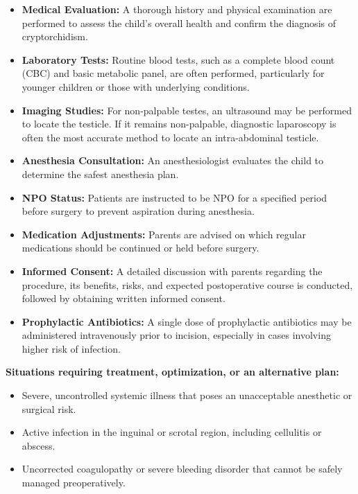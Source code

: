 \begin{itemize}
  \item \textbf{Medical Evaluation:} A thorough history and physical examination are performed to assess the child's overall health and confirm the diagnosis of cryptorchidism.
  
  \item \textbf{Laboratory Tests:} Routine blood tests, such as a complete blood count (CBC) and basic metabolic panel, are often performed, particularly for younger children or those with underlying conditions.
  
  \item \textbf{Imaging Studies:} For non-palpable testes, an ultrasound may be performed to locate the testicle. If it remains non-palpable, diagnostic laparoscopy is often the most accurate method to locate an intra-abdominal testicle.
  
  \item \textbf{Anesthesia Consultation:} An anesthesiologist evaluates the child to determine the safest anesthesia plan.
  
  \item \textbf{NPO Status:} Patients are instructed to be NPO for a specified period before surgery to prevent aspiration during anesthesia.
  
  \item \textbf{Medication Adjustments:} Parents are advised on which regular medications should be continued or held before surgery.
  
  \item \textbf{Informed Consent:} A detailed discussion with parents regarding the procedure, its benefits, risks, and expected postoperative course is conducted, followed by obtaining written informed consent.
  
  \item \textbf{Prophylactic Antibiotics:} A single dose of prophylactic antibiotics may be administered intravenously prior to incision, especially in cases involving higher risk of infection.
\end{itemize}

\textbf{Situations requiring treatment, optimization, or an alternative plan:}

\begin{itemize}
  \item Severe, uncontrolled systemic illness that poses an unacceptable anesthetic or surgical risk.
  \item Active infection in the inguinal or scrotal region, including cellulitis or abscess.
  \item Uncorrected coagulopathy or severe bleeding disorder that cannot be safely managed preoperatively.
\end{itemize}

